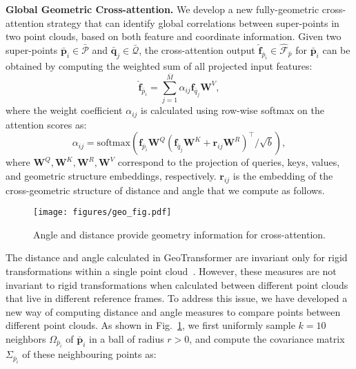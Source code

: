 \noindent\textbf{Global Geometric Cross-attention.}
We develop a new fully-geometric cross-attention strategy that can identify global correlations between super-points in two point clouds, based on both feature and coordinate information.
Given two super-points $\bar{\bm{p}}_i\in \bar{\bm{\mathcal{P}}}$ and $\bar{\bm{q}}_j\in \bar{\bm{\mathcal{Q}}}$, the cross-attention output $\bm{\hat{f}}_{\bar{p}_i}\in\hat{\bm{\mathcal{F}}}_{\bar{p}}$ for $\bm{\bar{p}}_i$ can be obtained by computing the weighted sum of all projected input features:
\begin{equation}
    \bm{\hat{f}}_{\bar{p}_i} = \sum_{j=1}^{\bar{M}}\alpha_{ij}\bm{f}_{\bar{q}_j}\bm{W}^V,
\end{equation}
where the weight coefficient $\alpha_{ij}$ is calculated using row-wise softmax on the attention scores as:
\begin{equation}
    \alpha_{ij} = \mbox{softmax}\left(  {\bm{f}_{\bar{p}_i}\bm{W}^Q\left(\bm{f}_{\bar{q}_j}\bm{W}^K+\bm{r}_{ij}\bm{W}^R\right)^\top}\big/\sqrt{b}\right),
\end{equation}
where $\bm{W}^Q,\bm{W}^K,\bm{W}^R,\bm{W}^V$ correspond to the projection of queries, keys, values, and geometric structure embeddings, respectively.
$\bm{r}_{ij}$ is the embedding of the cross-geometric structure of distance and angle that we compute as follows. 

\begin{figure}[t]
\centering  
\texttt{[image: figures/geo\_fig.pdf]}
\caption{
Angle and distance provide geometry information for cross-attention.}
\vspace{-0.4cm}
\label{fig:geo_figure}
\end{figure}


The distance and angle calculated in GeoTransformer are invariant only for rigid transformations within a single point cloud~\cite{qin2022geometric}. 
However, these measures are not invariant to rigid transformations when calculated between different point clouds that live in different reference frames.
To address this issue, we have developed a new way of computing distance and angle measures to compare points between different point clouds.
As shown in Fig.~\ref{fig:geo_figure}, we first uniformly sample $k=10$ neighbors $\Omega_{\bar{p}_i}$ of $\bar{\bm{p}}_i$ in a ball of radius $r>0$, and compute the covariance matrix $\Sigma_{\bar{p}_i}$ of these neighbouring points as:


